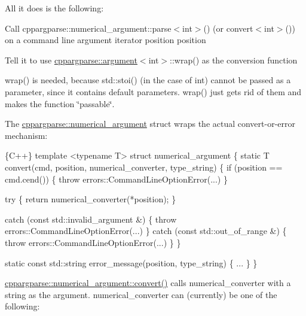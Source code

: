 All it does is the following\+:
\begin{DoxyItemize}
\item Call {\ttfamily cppargparse\+::numerical\+\_\+argument\+::parse$<$int$>$()} (or {\ttfamily convert$<$int$>$()}) on a command line argument iterator position {\ttfamily position}
\item Tell it to use {\ttfamily \hyperlink{structcppargparse_1_1argument}{cppargparse\+::argument}$<$int$>$\+::wrap()} as the conversion function
\end{DoxyItemize}

{\ttfamily wrap()} is needed, because {\ttfamily std\+::stoi()} (in the case of {\ttfamily int}) cannot be passed as a parameter, since it contains default parameters. {\ttfamily wrap()} just gets rid of them and makes the function \char`\"{}passable\char`\"{}.

The {\ttfamily \hyperlink{structcppargparse_1_1numerical__argument}{cppargparse\+::numerical\+\_\+argument}} struct wraps the actual convert-\/or-\/error mechanism\+: 
\begin{DoxyCode}
\{C++\}
template <typename T>
struct numerical\_argument
\{
    static T convert(cmd, position, numerical\_converter, type\_string)
    \{
        if (position == cmd.cend())
        \{
            throw errors::CommandLineOptionError(...)
        \}

        try
        \{
            return numerical\_converter(*position);
        \}

        catch (const std::invalid\_argument &)
        \{
            throw errors::CommandLineOptionError(...)
        \}
        catch (const std::out\_of\_range &)
        \{
            throw errors::CommandLineOptionError(...)
        \}
    \}

    static const std::string error\_message(position, type\_string)
    \{
        ...
    \}
\}
\end{DoxyCode}


{\ttfamily \hyperlink{structcppargparse_1_1numerical__argument_ab775dbbfc851bbd9052b70dfdf0dbb77}{cppargparse\+::numerical\+\_\+argument\+::convert()}} calls {\ttfamily numerical\+\_\+converter} with a string as the argument. {\ttfamily numerical\+\_\+converter} can (currently) be one of the following\+:

